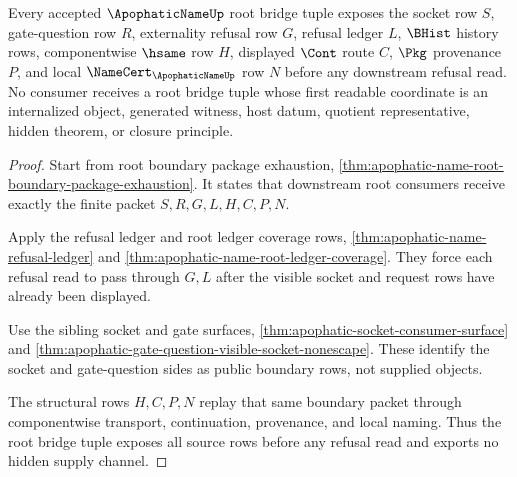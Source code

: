\begin{theorem}
\label{thm:apophatic-name-root-bridge-tuple-source}
Every accepted $\ApophaticNameUp$ root bridge tuple exposes the socket row $S$, gate-question row $R$, externality refusal row $G$, refusal ledger $L$, $\BHist$ history rows, componentwise $\hsame$ row $H$, displayed $\Cont$ route $C$, $\Pkg$ provenance $P$, and local $\NameCert_{\ApophaticNameUp}$ row $N$ before any downstream refusal read. No consumer receives a root bridge tuple whose first readable coordinate is an internalized object, generated witness, host datum, quotient representative, hidden theorem, or closure principle.
\end{theorem}
\begin{proof}
Start from root boundary package exhaustion, \autoref{thm:apophatic-name-root-boundary-package-exhaustion}. It states that downstream root consumers receive exactly the finite packet $S,R,G,L,H,C,P,N$.

Apply the refusal ledger and root ledger coverage rows, \autoref{thm:apophatic-name-refusal-ledger} and \autoref{thm:apophatic-name-root-ledger-coverage}. They force each refusal read to pass through $G,L$ after the visible socket and request rows have already been displayed.

Use the sibling socket and gate surfaces, \autoref{thm:apophatic-socket-consumer-surface} and \autoref{thm:apophatic-gate-question-visible-socket-nonescape}. These identify the socket and gate-question sides as public boundary rows, not supplied objects.

The structural rows $H,C,P,N$ replay that same boundary packet through componentwise transport, continuation, provenance, and local naming. Thus the root bridge tuple exposes all source rows before any refusal read and exports no hidden supply channel.
\end{proof}

